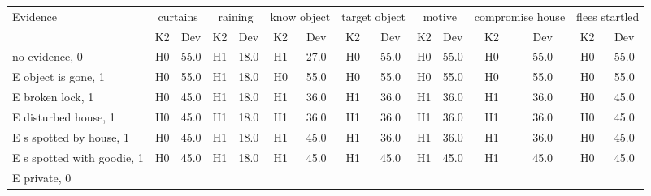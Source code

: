 \begin{table}\begin{tabular}{l|cc|cc|cc|cc|cc|cc|cc}\toprule\multirow{2}{*}{Evidence} & \multicolumn{2}{c}{curtains}& \multicolumn{2}{c}{raining}& \multicolumn{2}{c}{know object}& \multicolumn{2}{c}{target object}& \multicolumn{2}{c}{motive}& \multicolumn{2}{c}{compromise house}& \multicolumn{2}{c}{flees startled}\\& {K2} & {Dev}& {K2} & {Dev}& {K2} & {Dev}& {K2} & {Dev}& {K2} & {Dev}& {K2} & {Dev}& {K2} & {Dev}\\\midrule
no evidence, 0 & \cellcolor{Bittersweet}H0&\cellcolor{Bittersweet}55.0&\cellcolor{Bittersweet}H1&\cellcolor{Bittersweet}18.0&\cellcolor{Bittersweet}H1&\cellcolor{Bittersweet}27.0&\cellcolor{Bittersweet}H0&\cellcolor{Bittersweet}55.0&\cellcolor{Bittersweet}H0&\cellcolor{Bittersweet}55.0&\cellcolor{Bittersweet}H0&\cellcolor{Bittersweet}55.0&\cellcolor{Bittersweet}H0&\cellcolor{Bittersweet}55.0\\E object is gone, 1 & \cellcolor{Bittersweet}H0&\cellcolor{Bittersweet}55.0&\cellcolor{Bittersweet}H1&\cellcolor{Bittersweet}18.0&\cellcolor{Bittersweet}H0&\cellcolor{Bittersweet}55.0&\cellcolor{Bittersweet}H0&\cellcolor{Bittersweet}55.0&\cellcolor{Bittersweet}H0&\cellcolor{Bittersweet}55.0&\cellcolor{Bittersweet}H0&\cellcolor{Bittersweet}55.0&\cellcolor{Bittersweet}H0&\cellcolor{Bittersweet}55.0\\E broken lock, 1 & \cellcolor{Bittersweet}H0&\cellcolor{Bittersweet}45.0&\cellcolor{Bittersweet}H1&\cellcolor{Bittersweet}18.0&\cellcolor{Bittersweet}H1&\cellcolor{Bittersweet}36.0&\cellcolor{Bittersweet}H1&\cellcolor{Bittersweet}36.0&\cellcolor{Bittersweet}H1&\cellcolor{Bittersweet}36.0&\cellcolor{Bittersweet}H1&\cellcolor{Bittersweet}36.0&\cellcolor{Bittersweet}H0&\cellcolor{Bittersweet}45.0\\E disturbed house, 1 & \cellcolor{Bittersweet}H0&\cellcolor{Bittersweet}45.0&\cellcolor{Bittersweet}H1&\cellcolor{Bittersweet}18.0&\cellcolor{Bittersweet}H1&\cellcolor{Bittersweet}36.0&\cellcolor{Bittersweet}H1&\cellcolor{Bittersweet}36.0&\cellcolor{Bittersweet}H1&\cellcolor{Bittersweet}36.0&\cellcolor{Bittersweet}H1&\cellcolor{Bittersweet}36.0&\cellcolor{Bittersweet}H0&\cellcolor{Bittersweet}45.0\\E s spotted by house, 1 & \cellcolor{Bittersweet}H0&\cellcolor{Bittersweet}45.0&\cellcolor{Bittersweet}H1&\cellcolor{Bittersweet}18.0&\cellcolor{Bittersweet}H1&\cellcolor{Bittersweet}45.0&\cellcolor{Bittersweet}H1&\cellcolor{Bittersweet}36.0&\cellcolor{Bittersweet}H1&\cellcolor{Bittersweet}36.0&\cellcolor{Bittersweet}H1&\cellcolor{Bittersweet}36.0&\cellcolor{Bittersweet}H0&\cellcolor{Bittersweet}45.0\\E s spotted with goodie, 1 & \cellcolor{Bittersweet}H0&\cellcolor{Bittersweet}45.0&\cellcolor{Bittersweet}H1&\cellcolor{Bittersweet}18.0&\cellcolor{Bittersweet}H1&\cellcolor{Bittersweet}45.0&\cellcolor{Bittersweet}H1&\cellcolor{Bittersweet}45.0&\cellcolor{Bittersweet}H1&\cellcolor{Bittersweet}45.0&\cellcolor{Bittersweet}H1&\cellcolor{Bittersweet}45.0&\cellcolor{Bittersweet}H0&\cellcolor{Bittersweet}45.0\\E private, 0 & 
\end{tabular}
\end{table}
